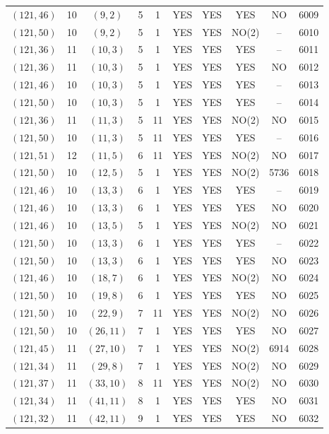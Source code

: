 \begin{longtable}{|c|c|c|c|c|c|c|c|c|c|}
$(121, 46)$ & 10 & $(9, 2)$ & 5 & 1 & YES & YES & YES & NO & 6009\\
$(121, 50)$ & 10 & $(9, 2)$ & 5 & 1 & YES & YES & NO(2) & -- & 6010\\
$(121, 36)$ & 11 & $(10, 3)$ & 5 & 1 & YES & YES & YES & -- & 6011\\
$(121, 36)$ & 11 & $(10, 3)$ & 5 & 1 & YES & YES & YES & NO & 6012\\
$(121, 46)$ & 10 & $(10, 3)$ & 5 & 1 & YES & YES & YES & -- & 6013\\
$(121, 50)$ & 10 & $(10, 3)$ & 5 & 1 & YES & YES & YES & -- & 6014\\
$(121, 36)$ & 11 & $(11, 3)$ & 5 & 11 & YES & YES & NO(2) & NO & 6015\\
$(121, 50)$ & 10 & $(11, 3)$ & 5 & 11 & YES & YES & YES & -- & 6016\\
$(121, 51)$ & 12 & $(11, 5)$ & 6 & 11 & YES & YES & NO(2) & NO & 6017\\
$(121, 50)$ & 10 & $(12, 5)$ & 5 & 1 & YES & YES & NO(2) & 5736 & 6018\\
$(121, 46)$ & 10 & $(13, 3)$ & 6 & 1 & YES & YES & YES & -- & 6019\\
$(121, 46)$ & 10 & $(13, 3)$ & 6 & 1 & YES & YES & YES & NO & 6020\\
$(121, 46)$ & 10 & $(13, 5)$ & 5 & 1 & YES & YES & NO(2) & NO & 6021\\
$(121, 50)$ & 10 & $(13, 3)$ & 6 & 1 & YES & YES & YES & -- & 6022\\
$(121, 50)$ & 10 & $(13, 3)$ & 6 & 1 & YES & YES & YES & NO & 6023\\
$(121, 46)$ & 10 & $(18, 7)$ & 6 & 1 & YES & YES & NO(2) & NO & 6024\\
$(121, 50)$ & 10 & $(19, 8)$ & 6 & 1 & YES & YES & YES & NO & 6025\\
$(121, 50)$ & 10 & $(22, 9)$ & 7 & 11 & YES & YES & NO(2) & NO & 6026\\
$(121, 50)$ & 10 & $(26, 11)$ & 7 & 1 & YES & YES & YES & NO & 6027\\
$(121, 45)$ & 11 & $(27, 10)$ & 7 & 1 & YES & YES & NO(2) & 6914 & 6028\\
$(121, 34)$ & 11 & $(29, 8)$ & 7 & 1 & YES & YES & NO(2) & NO & 6029\\
$(121, 37)$ & 11 & $(33, 10)$ & 8 & 11 & YES & YES & NO(2) & NO & 6030\\
$(121, 34)$ & 11 & $(41, 11)$ & 8 & 1 & YES & YES & YES & NO & 6031\\
$(121, 32)$ & 11 & $(42, 11)$ & 9 & 1 & YES & YES & YES & NO & 6032\\

\end{longtable}
